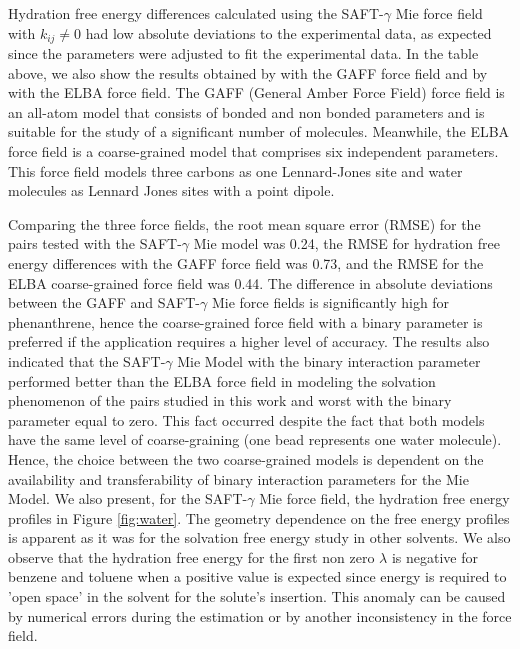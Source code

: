 Hydration free energy differences calculated using the SAFT-$\gamma$ Mie force field with $k_{ij} \neq 0$ had low absolute deviations to the experimental data, as expected since the parameters were adjusted to fit the experimental data. In the table above, we also show the results obtained by  with the GAFF force field and by  with the ELBA force field. The GAFF (General Amber Force Field) force field is an all-atom model that consists of bonded and non bonded parameters and is suitable for the study of a significant number of molecules. Meanwhile, the ELBA force field is a coarse-grained model that comprises six independent parameters. This force field models three carbons as one Lennard-Jones site and water molecules as Lennard Jones sites with a point dipole. 

Comparing the three force fields, the root mean square error (RMSE) for the pairs tested with the SAFT-$\gamma$     Mie model was  0.24, the RMSE for hydration free energy differences with the GAFF force field was 0.73, and the RMSE for the ELBA coarse-grained force field was 0.44. The difference in absolute deviations between the GAFF and SAFT-$\gamma$     Mie force fields is significantly high for phenanthrene, hence the coarse-grained force field with a binary parameter is preferred if the application requires a higher level of accuracy. The results also indicated that the SAFT-$\gamma$ Mie Model with the binary interaction parameter performed better than the ELBA force field in modeling the solvation phenomenon of the pairs studied in this work and worst with the binary parameter equal to zero. This fact occurred despite the fact that both models have the same level of coarse-graining (one bead represents one water molecule). Hence, the choice between the two coarse-grained models is dependent on the availability and transferability of binary interaction parameters for the Mie Model. We also present, for the SAFT-$\gamma$ Mie force field, the hydration free energy profiles in Figure \ref{fig:water}. The geometry dependence on the free energy profiles is apparent as it was for the solvation free energy study in other solvents. We also observe that the hydration free energy for the first non zero $\lambda$ is negative for benzene and toluene when a positive value is expected since energy is required to 'open space' in the solvent for the solute's insertion. This anomaly can be caused by numerical errors during the estimation or by another inconsistency in the force field. 


